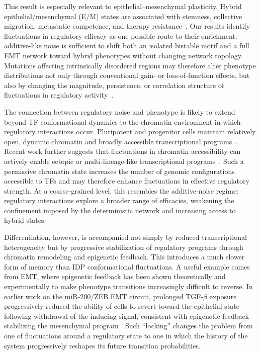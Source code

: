 \documentclass[11pt]{article}
\begin{document}
This result is especially relevant to epithelial--mesenchymal plasticity. Hybrid epithelial/mesenchymal (E/M) states are associated with stemness, collective migration, metastatic competence, and therapy resistance~\cite{Pastushenko2019EMTMetastasis, jolly2015implications, pasani2020hybrid, Sahoo2021}. Our results identify fluctuations in regulatory efficacy as one possible route to their enrichment: additive-like noise is sufficient to shift both an isolated bistable motif and a full EMT network toward hybrid phenotypes without changing network topology. Mutations affecting intrinsically disordered regions may therefore alter phenotype distributions not only through conventional gain- or loss-of-function effects, but also by changing the magnitude, persistence, or correlation structure of fluctuations in regulatory activity~\cite{Kulkarni2023IntrinsicallyLater}.

The connection between regulatory noise and phenotype is likely to extend beyond TF conformational dynamics to the chromatin environment in which regulatory interactions occur. Pluripotent and progenitor cells maintain relatively open, dynamic chromatin and broadly accessible transcriptional programs~\cite{Meshorer2006HyperdynamicCells, Efroni2008GlobalCells}. Recent work further suggests that fluctuations in chromatin accessibility can actively enable ectopic or multi-lineage-like transcriptional programs~\cite{Gamble2025}. Such a permissive chromatin state increases the number of genomic configurations accessible to TFs and may therefore enhance fluctuations in effective regulatory strength. At a coarse-grained level, this resembles the additive-noise regime: regulatory interactions explore a broader range of efficacies, weakening the confinement imposed by the deterministic network and increasing access to hybrid states.

Differentiation, however, is accompanied not simply by reduced transcriptional heterogeneity but by progressive stabilization of regulatory programs through chromatin remodeling and epigenetic feedback. This introduces a much slower form of memory than IDP conformational fluctuations. A useful example comes from EMT, where epigenetic feedback has been shown theoretically and experimentally to make phenotype transitions increasingly difficult to reverse. In earlier work on the miR-200/ZEB EMT circuit, prolonged TGF-$\beta$ exposure progressively reduced the ability of cells to revert toward the epithelial state following withdrawal of the inducing signal, consistent with epigenetic feedback stabilizing the mesenchymal program \cite{Jia2019, Jia2020EpigeneticEMT}. Such ``locking'' changes the problem from one of fluctuations around a regulatory state to one in which the history of the system progressively reshapes its future transition probabilities.
\end{document}
